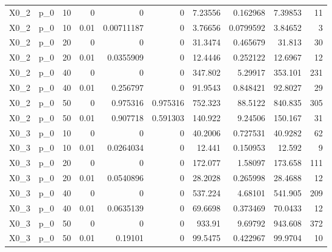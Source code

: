 \begin{tabular}{llrrrrrrrr}
 X0\_2 & p\_0     &  10 & 0    & 0          & 0        &     7.23556 &   0.162968  &      7.39853 &         11 \\
 X0\_2 & p\_0     &  10 & 0.01 & 0.00711187 & 0        &     3.76656 &   0.0799592 &      3.84652 &          3 \\
 X0\_2 & p\_0     &  20 & 0    & 0          & 0        &    31.3474  &   0.465679  &     31.813   &         30 \\
 X0\_2 & p\_0     &  20 & 0.01 & 0.0355909  & 0        &    12.4446  &   0.252122  &     12.6967  &         12 \\
 X0\_2 & p\_0     &  40 & 0    & 0          & 0        &   347.802   &   5.29917   &    353.101   &        231 \\
 X0\_2 & p\_0     &  40 & 0.01 & 0.256797   & 0        &    91.9543  &   0.848421  &     92.8027  &         29 \\
 X0\_2 & p\_0     &  50 & 0    & 0.975316   & 0.975316 &   752.323   &  88.5122    &    840.835   &        305 \\
 X0\_2 & p\_0     &  50 & 0.01 & 0.907718   & 0.591303 &   140.922   &   9.24506   &    150.167   &         31 \\
 X0\_3 & p\_0     &  10 & 0    & 0          & 0        &    40.2006  &   0.727531  &     40.9282  &         62 \\
 X0\_3 & p\_0     &  10 & 0.01 & 0.0264034  & 0        &    12.441   &   0.150953  &     12.592   &          9 \\
 X0\_3 & p\_0     &  20 & 0    & 0          & 0        &   172.077   &   1.58097   &    173.658   &        111 \\
 X0\_3 & p\_0     &  20 & 0.01 & 0.0540896  & 0        &    28.2028  &   0.265998  &     28.4688  &         12 \\
 X0\_3 & p\_0     &  40 & 0    & 0          & 0        &   537.224   &   4.68101   &    541.905   &        209 \\
 X0\_3 & p\_0     &  40 & 0.01 & 0.0635139  & 0        &    69.6698  &   0.373469  &     70.0433  &         12 \\
 X0\_3 & p\_0     &  50 & 0    & 0          & 0        &   933.91    &   9.69792   &    943.608   &        372 \\
 X0\_3 & p\_0     &  50 & 0.01 & 0.19101    & 0        &    99.5475  &   0.422967  &     99.9704  &         10 \\
\hline
\end{tabular}
